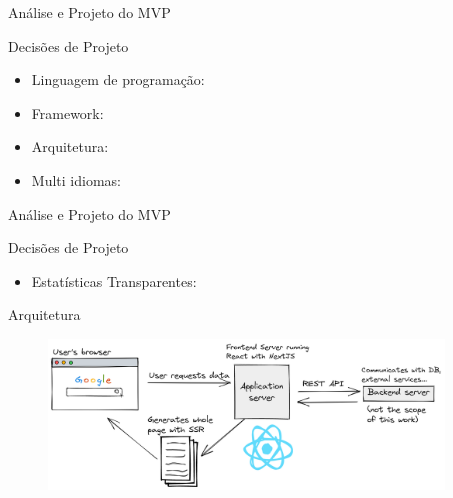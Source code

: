\begin{frame}{{\sffamily Análise e Projeto do MVP}}
  \begin{block}{Decisões de Projeto}
    \begin{itemize}
      \item Linguagem de programação:
      \item Framework:
      \item Arquitetura:
      \item Multi idiomas:
    \end{itemize}
  \end{block}
\end{frame}
\begin{frame}{{\sffamily Análise e Projeto do MVP}}
  \begin{block}{Decisões de Projeto}
    \begin{itemize}
      \item Estatísticas Transparentes:
    \end{itemize}
  \end{block}
\end{frame}

\begin{frame}{{\sffamily Arquitetura}}
  \begin{figure}
    \vfill
    \includegraphics[width=10.5cm, ]{imagens/6-architecture.png}
    \vfill
  \end{figure}

\end{frame}